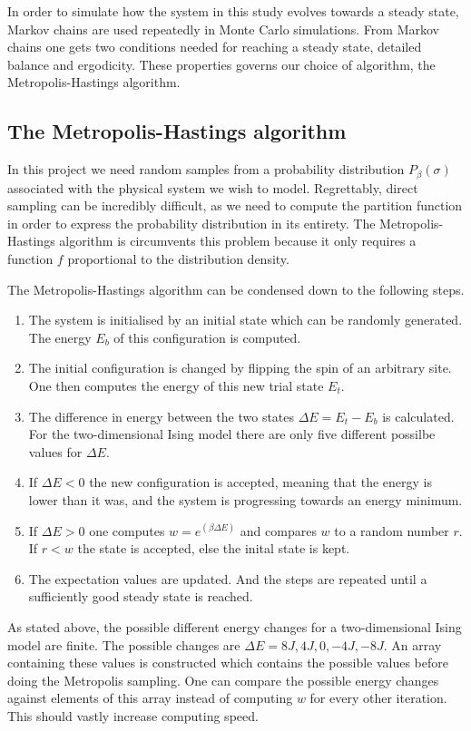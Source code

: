 \documentclass[10pt,a4paper]{amsart}
\begin{document}
In order to simulate how the system in this study evolves towards a steady state, Markov chains are used repeatedly in Monte Carlo simulations. From Markov chains one gets two conditions needed for reaching a steady state, detailed balance and ergodicity. These properties governs our choice of algorithm, the Metropolis-Hastings algorithm.

\subsection{The Metropolis-Hastings algorithm}
In this project we need random samples from a probability distribution $P_\beta (\sigma)$ associated with the physical system we wish to model. Regrettably, direct sampling can be incredibly difficult, as we need to compute the partition function in order to express the probability distribution in its entirety. The Metropolis-Hastings algorithm is circumvents this problem because it only requires a function $f$ proportional to the distribution density.

The Metropolis-Hastings algorithm can be condensed down to the following steps.
\begin{enumerate}
\item The system is initialised by an initial state which can be randomly generated. The energy $E_b$ of this configuration is computed.
\item The initial configuration is changed by flipping the spin of an arbitrary site. One then computes the energy of this new trial state $E_t$.
\item The difference in energy between the two states $\Delta E = E_t - E_b$ is calculated. For the two-dimensional Ising model there are only five different possilbe values for $\Delta E$.
\item If $ \Delta E < 0$ the new configuration is accepted, meaning that the energy is lower than it was, and the system is progressing towards an energy minimum.
\item If $ \Delta E > 0$ one computes $w = e^(\beta \Delta E)$ and compares $w$ to a random number $r$. If $r < w$ the state is accepted, else the inital state is kept.
\item The expectation values are updated. And the steps are repeated until a sufficiently good steady state is reached.
\end{enumerate}

As stated above, the possible different energy changes for a two-dimensional Ising model are finite. The possible changes are $\Delta E = 8J, 4J, 0, -4J, -8J$.  An array containing these values is constructed which contains the possible values before doing the Metropolis sampling. One can compare the possible energy changes against elements of this array instead of computing $w$ for every other iteration. This should vastly increase computing speed.
\end{document}
